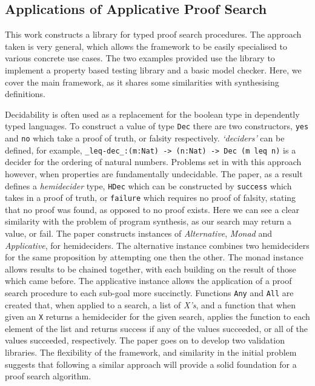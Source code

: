\documentclass[a4paper]{article}
\begin{document}
\subsection{Applications of Applicative Proof Search}
\label{sec:org8a420b4}
This work constructs a library for typed proof search procedures. The approach taken is very general, which allows the 
framework to be easily specialised to various concrete use cases. The two examples provided use the library to implement a 
property based testing library and a basic model checker. Here, we cover the main framework, as it shares some similarities 
with synthesising definitions. 

Decidability is often used as a replacement for the boolean type in dependently typed languages. To construct a value of type 
\texttt{Dec} there are two constructors, \texttt{yes} and \texttt{no} which take a proof of truth, or falsity respectively. \emph{`deciders'} can be defined, 
for example, \texttt{\_leq-dec\_:(m:Nat) -> (n:Nat) -> Dec (m leq n)} is a decider for the ordering of natural numbers.
Problems set in with this approach however, when properties are fundamentally undecidable. The paper, as a result defines
a \emph{hemidecider} type, \texttt{HDec} which can be constructed by \texttt{success} which takes in a proof of truth, or \texttt{failure} which
requires no proof of falsity, stating that no proof was found, as opposed to no proof exists. 
Here we can see a clear similarity with the problem of program synthesis, as our search may return a value, or fail.
The paper constructs instances of \emph{Alternative}, \emph{Monad} and \emph{Applicative}, for hemideciders. The alternative instance combines
two hemideciders for the same proposition by attempting one then the other. The monad instance allows results to be 
chained together, with each building on the result of those which came before. The applicative instance allows the application
of a proof search procedure to each sub-goal more succinctly. Functions \texttt{Any} and \texttt{All} are created that, when applied to a 
search, a list of \emph{X's}, and a function that when given an \texttt{X} returns a hemidecider for the given search, applies the 
function to each element of the list and returns success if any of the values succeeded, or all of the values succeeded, respectively. 
The paper goes on to develop two validation libraries. The flexibility of the framework, and similarity in the initial problem 
suggests that following a similar approach will provide a solid foundation for a proof search algorithm.
\end{document}
